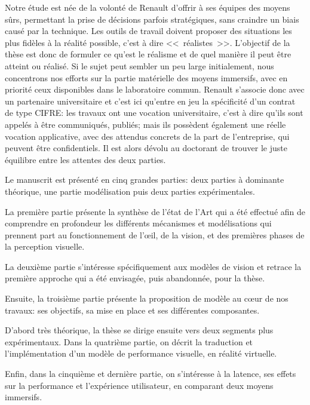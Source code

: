 \par Notre étude est née de la volonté de Renault d'offrir à ses équipes des moyens sûrs, permettant la prise de décisions parfois stratégiques, sans craindre un biais causé par la technique. Les outils de travail doivent proposer des situations les plus fidèles à la réalité possible, c'est à dire <<~réalistes~>>. L'objectif de la thèse est donc de formuler ce qu'est le réalisme et de quel manière il peut être atteint ou réalisé. Si le sujet peut sembler un peu large initialement, nous concentrons nos efforts sur la partie matérielle des moyens immersifs, avec en priorité ceux disponibles dans le laboratoire commun. Renault s'associe donc avec un partenaire universitaire et c'est ici qu'entre en jeu la spécificité d'un contrat de type CIFRE: les travaux ont une vocation universitaire, c'est à dire qu'ils sont appelés à être communiqués, publiés; mais ils possèdent également une réelle vocation applicative, avec des attendus concrets de la part de l'entreprise, qui peuvent être confidentiels. Il est alors dévolu au doctorant de trouver le juste équilibre entre les attentes des deux parties.

\par Le manuscrit est présenté en cinq grandes parties: deux parties à dominante théorique, une partie modélisation puis deux parties expérimentales.

\par La première partie présente la synthèse de l'état de l'Art qui a été effectué afin de comprendre en profondeur les différents mécanismes et modélisations qui prennent part au fonctionnement de l'œil, de la vision, et des premières phases de la perception visuelle.

\par La deuxième partie s'intéresse spécifiquement aux modèles de vision et retrace la première approche qui a été envisagée, puis abandonnée, pour la thèse.

\par Ensuite, la troisième partie présente la proposition de modèle au cœur de nos travaux: ses objectifs, sa mise en place et ses différentes composantes.

\par D'abord très théorique, la thèse se dirige ensuite vers deux segments plus expérimentaux. Dans la quatrième partie, on décrit la traduction et l'implémentation d'un modèle de performance visuelle, en réalité virtuelle.

\par Enfin, dans la cinquième et dernière partie, on s'intéresse à la latence, ses effets sur la performance et l'expérience utilisateur, en comparant deux moyens immersifs.